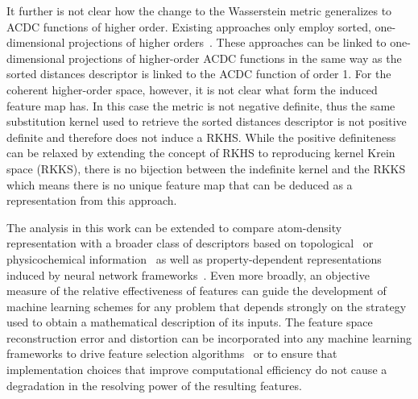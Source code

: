 It further is not clear how the change to the Wasserstein metric generalizes to ACDC functions of higher order.
Existing approaches only employ sorted, one-dimensional projections of higher orders~\cite{huang2016communication}.
These approaches can be linked to one-dimensional projections of higher-order ACDC functions in the same way as the sorted distances descriptor is linked to the ACDC function of order 1.
For the coherent higher-order space, however, it is not clear what form the induced feature map has.
In this case the metric is not negative definite, thus the same substitution kernel used to retrieve the sorted distances descriptor is not positive definite and therefore does not induce a RKHS.
While the positive definiteness can be relaxed by extending the concept of RKHS to reproducing kernel Krein space (RKKS), there is no bijection between the indefinite kernel and the RKKS~\cite{pmlr-v80-oglic18a} which means there is no unique feature map that can be deduced as a representation from this approach.

The analysis in this work can be extended to compare atom-density representation with a broader class of descriptors based on topological~\cite{isayev2017universal, sutton2019crowd, liu2019n} or physicochemical information~\cite{pilania2013accelerating, ward2016general, ouya+18prm} as well as property-dependent representations induced by neural network frameworks~\cite{schu+18jcp, cohen2018spherical}. 
Even more broadly, an objective measure of the relative effectiveness of features can guide the development of machine learning schemes for any problem that depends strongly on the strategy used to obtain a mathematical description of its inputs. 
The feature space reconstruction error and distortion can be incorporated into any machine learning frameworks to drive feature selection algorithms~\cite{imba+18jcp,ouya+18prm,paleico2021bin} or to ensure that implementation choices that improve computational efficiency do not cause a degradation in the resolving power of the resulting features.


